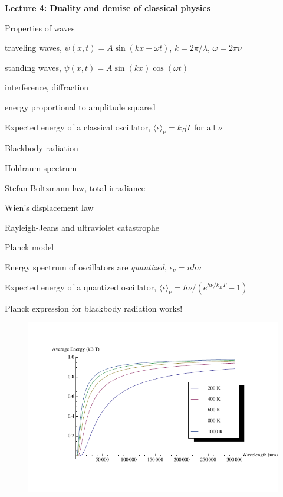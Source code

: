 \documentclass[11pt]{article}
\begin{document}
\begin{outline}
\item{{\bf Lecture 4: Duality and demise of classical physics}}
  \begin{outline}
    \item{Properties of waves}
      \begin{outline}
      \item traveling waves, $\psi(x,t)=A \sin(kx-\omega t)$, $k=2\pi/\lambda$, $\omega=2\pi\nu$
      \item standing waves, $\psi(x,t) = A \sin(kx) \cos(\omega t) $
      \item interference, diffraction
      \item energy proportional to amplitude squared
      \item  Expected energy of a classical oscillator, $\langle \epsilon \rangle _\nu = k_B T$ for all $\nu$
      \end{outline}
    \item{Blackbody radiation}
      \begin{outline}
      \item Hohlraum spectrum
      \item Stefan-Boltzmann law, total irradiance 
      \item Wien's displacement law
      \item{Rayleigh-Jeans and ultraviolet catastrophe}
      \item{Planck model}
        \begin{outline}
        \item Energy spectrum of oscillators are {\em quantized}, $\epsilon_\nu=nh\nu$ 
        \item Expected energy of a quantized oscillator, $\langle \epsilon \rangle_\nu = h\nu/\left (
          e^{h\nu/k_BT}-1 \right ) $
      \item Planck expression for blackbody radiation works!
      \end{outline}
    \end{outline}
\begin{figure}
\begin{center}
\includegraphics[scale=1.25]{Images/PlanckEnergy.pdf}

\end{center}
\end{figure}
\end{outline}
\end{outline}
\end{document}
